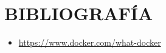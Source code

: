 \documentclass[10pt]{article}   			%
\begin{document}
\section{BIBLIOGRAFÍA}
	\begin{itemize}
		\item \href{https://www.docker.com/what-docker}{https://www.docker.com/what-docker}
	\end{itemize}
\end{document}
